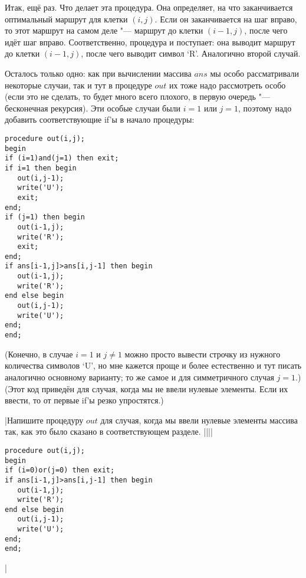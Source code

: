 Итак, ещё раз. Что делает эта процедура. Она определяет, на что заканчивается оптимальный маршрут
для клетки $(i,j)$. Если он заканчивается на шаг вправо, то этот маршрут на самом деле "--- маршрут
до клетки $(i-1,j)$, после чего идёт шаг вправо. Соответственно, процедура и поступает: она выводит
маршрут до клетки $(i-1,j)$, после чего выводит символ `R'. Аналогично второй случай.

Осталось только одно: как при вычислении массива $ans$ мы особо рассматривали некоторые случаи, так и тут в процедуре $out$ их тоже надо рассмотреть особо (если это не сделать, то будет много всего плохого, в первую очередь "--- бесконечная рекурсия). Эти особые случаи были $i=1$ или $j=1$, поэтому надо добавить соответствующие if'ы в начало процедуры:
\begin{codesampleo}\begin{verbatim}
procedure out(i,j);
begin
if (i=1)and(j=1) then exit;
if i=1 then begin
   out(i,j-1);
   write('U');
   exit;
end;
if (j=1) then begin
   out(i-1,j);
   write('R');
   exit;
end;
if ans[i-1,j]>ans[i,j-1] then begin
   out(i-1,j);
   write('R');
end else begin
   out(i,j-1);
   write('U');
end;
end;
\end{verbatim}\end{codesampleo}
(Конечно, в случае $i=1$ и $j\neq 1$ можно просто вывести строчку из нужного количества символов
`U', но мне кажется проще и более естественно и тут писать аналогично основному варианту; то же 
самое и для симметричного случая $j=1$.) (Этот код приведён для случая, когда мы не ввели нулевые элементы. Если
их ввести, то от первые if'ы резко упростятся.)

\task|Напишите процедуру $out$ для случая, когда мы ввели нулевые элементы массива так, как это 
было сказано в соответствующем разделе.
||||
\begin{codesampleo}\begin{verbatim}
procedure out(i,j);
begin
if (i=0)or(j=0) then exit;
if ans[i-1,j]>ans[i,j-1] then begin
   out(i-1,j);
   write('R');
end else begin
   out(i,j-1);
   write('U');
end;
end;
\end{verbatim}\end{codesampleo}
|\label{outzeroline}

